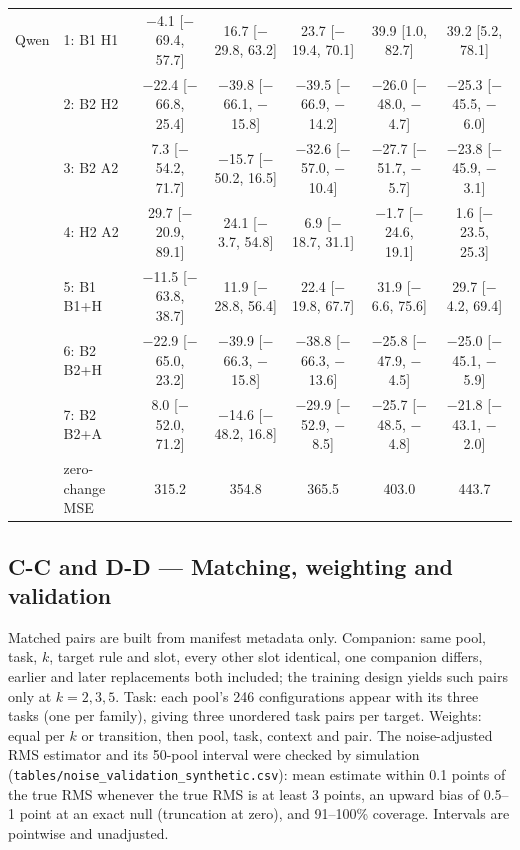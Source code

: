 \begin{table}[h]
{\begin{tabular}{llccccc}
\midrule
Qwen & 1: B1 \cto{} H1 & $-$4.1 [$-$69.4, 57.7] & 16.7 [$-$29.8, 63.2] & 23.7 [$-$19.4, 70.1] & 39.9 [1.0, 82.7] & 39.2 [5.2, 78.1] \\
 & 2: B2 \cto{} H2 & $-$22.4 [$-$66.8, 25.4] & $-$39.8 [$-$66.1, $-$15.8] & $-$39.5 [$-$66.9, $-$14.2] & $-$26.0 [$-$48.0, $-$4.7] & $-$25.3 [$-$45.5, $-$6.0] \\
 & 3: B2 \cto{} A2 & 7.3 [$-$54.2, 71.7] & $-$15.7 [$-$50.2, 16.5] & $-$32.6 [$-$57.0, $-$10.4] & $-$27.7 [$-$51.7, $-$5.7] & $-$23.8 [$-$45.9, $-$3.1] \\
 & 4: H2 \cto{} A2 & 29.7 [$-$20.9, 89.1] & 24.1 [$-$3.7, 54.8] & 6.9 [$-$18.7, 31.1] & $-$1.7 [$-$24.6, 19.1] & 1.6 [$-$23.5, 25.3] \\
 & 5: B1 \cto{} B1+H & $-$11.5 [$-$63.8, 38.7] & 11.9 [$-$28.8, 56.4] & 22.4 [$-$19.8, 67.7] & 31.9 [$-$6.6, 75.6] & 29.7 [$-$4.2, 69.4] \\
 & 6: B2 \cto{} B2+H & $-$22.9 [$-$65.0, 23.2] & $-$39.9 [$-$66.3, $-$15.8] & $-$38.8 [$-$66.3, $-$13.6] & $-$25.8 [$-$47.9, $-$4.5] & $-$25.0 [$-$45.1, $-$5.9] \\
 & 7: B2 \cto{} B2+A & 8.0 [$-$52.0, 71.2] & $-$14.6 [$-$48.2, 16.8] & $-$29.9 [$-$52.9, $-$8.5] & $-$25.7 [$-$48.5, $-$4.8] & $-$21.8 [$-$43.1, $-$2.0] \\
 & zero-change MSE & 315.2 & 354.8 & 365.5 & 403.0 & 443.7 \\
\bottomrule
\end{tabular}
}
\end{table}

\subsection*{C-C and D-D --- Matching, weighting and validation}
Matched pairs are built from manifest metadata only. Companion: same pool, task, $k$, target rule and slot, every other slot identical, one companion differs, earlier and later replacements both included; the training design yields such pairs only at $k=2,3,5$. Task: each pool's 246 configurations appear with its three tasks (one per family), giving three unordered task pairs per target. Weights: equal per $k$ or transition, then pool, task, context and pair. The noise-adjusted RMS estimator and its 50-pool interval were checked by simulation (\texttt{tables/noise\_validation\_synthetic.csv}): mean estimate within 0.1 points of the true RMS whenever the true RMS is at least 3 points, an upward bias of 0.5--1 point at an exact null (truncation at zero), and 91--100\% coverage. Intervals are pointwise and unadjusted.

